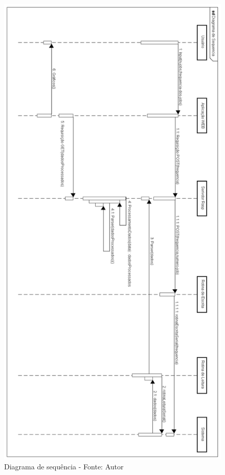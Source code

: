 \begin{figure}[H]
\label{fig:diagrama_sequencia_pc2}
\centering
\includegraphics[keepaspectratio=true,scale=0.5]{figuras/diagrama_sequencia_pc2.png}
\caption{Diagrama de sequência - Fonte: Autor}
\end{figure}

